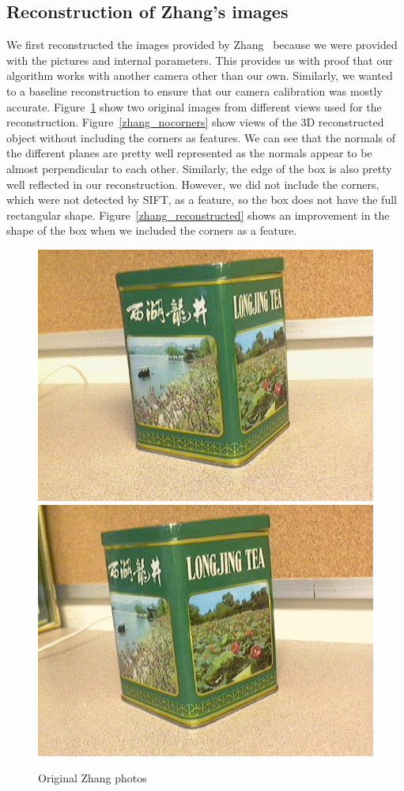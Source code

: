 \subsection{Reconstruction of Zhang's images}
We first reconstructed the images provided by Zhang~\cite{Calibration} because we were provided with the pictures and internal parameters. This provides us with proof that our algorithm works with another camera other than our own. Similarly, we wanted to a baseline reconstruction to ensure that our camera calibration was mostly accurate. Figure~\ref{zhang_original} show two original images from different views used for the reconstruction. Figure~\ref{zhang_nocorners} show views of the 3D reconstructed object without including the corners as features. We can see that the normals of the different planes are pretty well represented as the normals appear to be almost perpendicular to each other. Similarly, the edge of the box is also pretty well reflected in our reconstruction. However, we did not include the corners, which were not detected by SIFT, as a feature, so the box does not have the full rectangular shape. Figure~\ref{zhang_reconstructed} shows an improvement in the shape of the box when we included the corners as a feature.

\begin{figure}[H]
\begin{center}
\includegraphics[width=0.45\linewidth]{figures/TeaBox1.jpg}
\includegraphics[width=0.45\linewidth]{figures/TeaBox2.jpg}
\end{center}
\caption{Original Zhang photos}
\label{zhang_original}
\end{figure}

